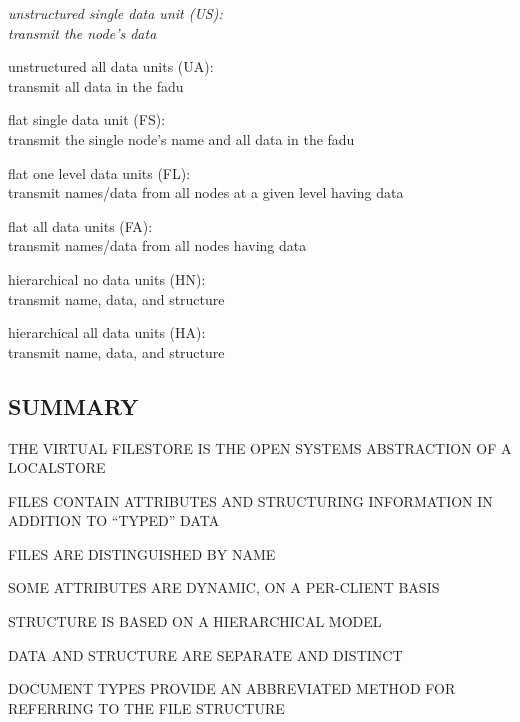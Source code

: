 \begin{note}\em
unstructured single data unit (US):\\
transmit the node's data

unstructured all data units (UA):\\
transmit all data in the fadu

flat single data unit (FS):\\
transmit the single node's name and all data in the fadu

flat one level data units (FL):\\
transmit names/data from all nodes at a given level having data

flat all data units (FA):\\
transmit names/data from all nodes having data

hierarchical no data units (HN):\\
transmit name, data, and structure

hierarchical all data units (HA):\\
transmit name, data, and structure
\end{note}


\begin{bwslide}
\part*	{SUMMARY}\bf

\begin{nrtc}
\item	THE VIRTUAL FILESTORE IS THE OPEN SYSTEMS ABSTRACTION OF A LOCALSTORE

\item	FILES CONTAIN ATTRIBUTES AND STRUCTURING INFORMATION IN ADDITION TO
	``TYPED'' DATA

\item	FILES ARE DISTINGUISHED BY NAME

\item	SOME ATTRIBUTES ARE DYNAMIC, ON A PER-CLIENT BASIS

\item	STRUCTURE IS BASED ON A HIERARCHICAL MODEL

\item	DATA AND STRUCTURE ARE SEPARATE AND DISTINCT

\item	DOCUMENT TYPES PROVIDE AN ABBREVIATED METHOD FOR REFERRING TO THE
	FILE STRUCTURE
\end{nrtc}
\end{bwslide}
